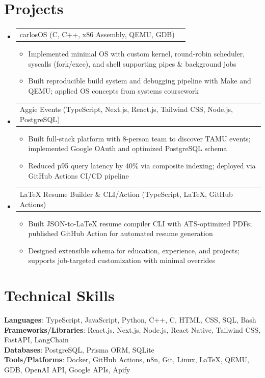 \documentclass[letterpaper,11pt]{article}
\makeatletter
\newcommand{\resumeItem}[1]{
  \item\small{{#1 \vspace{-2pt}}}
}
\newcommand{\resumeProjectHeading}[2]{
    \item
    \begin{tabular*}{0.97\textwidth}{l@{\extracolsep{\fill}}r}
      \small#1 & #2 \\
    \end{tabular*}\vspace{-7pt}
}
\newcommand{\resumeSubHeadingListStart}{\begin{itemize}[leftmargin=0.15in, label={}]}
\newcommand{\resumeSubHeadingListEnd}{\end{itemize}}
\newcommand{\resumeItemListStart}{\begin{itemize}}
\newcommand{\resumeItemListEnd}{\end{itemize}\vspace{-5pt}}
\makeatother
\begin{document}
\section{Projects}
\resumeSubHeadingListStart
\resumeProjectHeading
  {carlosOS (C, C++, x86 Assembly, QEMU, GDB)}{}
  \resumeItemListStart
    \resumeItem{Implemented minimal OS with custom kernel, round-robin scheduler, syscalls (fork/exec), and shell supporting pipes \& background jobs}
    \resumeItem{Built reproducible build system and debugging pipeline with Make and QEMU; applied OS concepts from systems coursework}
  \resumeItemListEnd

\resumeProjectHeading
  {Aggie Events (TypeScript, Next.js, React.js, Tailwind CSS, Node.js, PostgreSQL)}{}
  \resumeItemListStart
    \resumeItem{Built full-stack platform with 8-person team to discover TAMU events; implemented Google OAuth and optimized PostgreSQL schema}
    \resumeItem{Reduced p95 query latency by 40\% via composite indexing; deployed via GitHub Actions CI/CD pipeline}
  \resumeItemListEnd

\resumeProjectHeading
  {LaTeX Resume Builder \& CLI/Action (TypeScript, LaTeX, GitHub Actions)}{}
  \resumeItemListStart
    \resumeItem{Built JSON-to-LaTeX resume compiler CLI with ATS-optimized PDFs; published GitHub Action for automated resume generation}
    \resumeItem{Designed extensible schema for education, experience, and projects; supports job-targeted customization with minimal overrides}
  \resumeItemListEnd
\resumeSubHeadingListEnd

\section{Technical Skills}
\begin{itemize}[leftmargin=0.15in, label={}]
  \small{\item{
    \textbf{Languages}{: TypeScript, JavaScript, Python, C++, C, HTML, CSS, SQL, Bash} \\
    \textbf{Frameworks/Libraries}{: React.js, Next.js, Node.js, React Native, Tailwind CSS, FastAPI, LangChain} \\
    \textbf{Databases}{: PostgreSQL, Prisma ORM, SQLite} \\
    \textbf{Tools/Platforms}{: Docker, GitHub Actions, n8n, Git, Linux, LaTeX, QEMU, GDB, OpenAI API, Google APIs, Apify}
  }}
\end{itemize}
\end{document}
